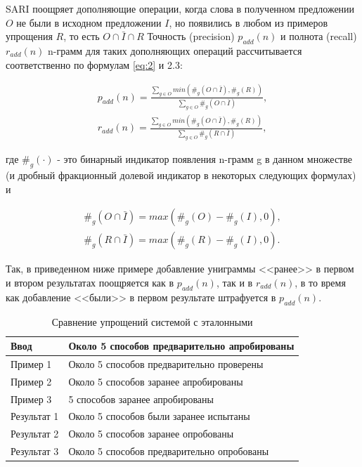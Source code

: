 SARI поощряет дополняющие операции, когда слова в полученном предложении $O$ не были в исходном предложении $I$, но появились в любом из примеров упрощения $R$, то есть $O\cap\bar{I}\cap{R}$
Точность (precision) $p_{add}(n)$ и полнота (recall) $r_{add}(n)$ n-грамм для таких дополняющих операций рассчитывается соответственно по формулам \ref{eq:2} и 2.3: 


\begin{eqnarray} 
	\label{eq:2}
	p_{add}(n) = \frac{\sum\limits_{g\in{O}}^{} min\left( \#_{g}\left(O\cap{\bar{I}}\right), \#_{g}\left(R\right)\right)}{\sum\limits_{g\in{O}}^{} \#_{g}\left(O\cap{\bar{I}}\right)} ,\\
	r_{add}(n) = \frac{\sum\limits_{g\in{O}}^{} min\left( \#_{g}\left(O\cap{\bar{I}}\right), \#_{g}\left(R\right)\right)}{\sum\limits_{g\in{O}}^{} \#_{g}\left(R\cap{\bar{I}}\right)} ,
\end{eqnarray}

где $\#_{g}\left(\cdot\right)$ - это бинарный индикатор появления n-грамм g в данном множестве (и дробный фракционный долевой индикатор в некоторых следующих формулах) и 

\begin{eqnarray} 
	\label{eq:4}
	\#_{g}\left(O\cap{\bar{I}}\right) = max\left(\#_{g}\left(O\right) - \#_{g}\left(I\right), 0\right) ,\\
	\#_{g}\left(R\cap{\bar{I}}\right) = max\left(\#_{g}\left(R\right) - \#_{g}\left(I\right), 0\right) .
\end{eqnarray}

Так, в приведенном ниже примере добавление униграммы <<ранее>> в первом и втором результатах поощряется как в $p_{add}(n)$, так и в $r_{add}(n)$, в то время как добавление <<были>> в первом результате штрафуется в $p_{add}(n)$.

\begin{table}[h]
	\caption{Сравнение упрощений системой с эталонными}
	\label{tabular:example}
	\begin{tabular}{|l|l|}
		\hline
		Ввод        & Около 5 способов предварительно  апробированы \\ \hline
		Пример 1    & Около 5 способов предварительно проверены     \\ \hline
		Пример 2    & Около 5 способов заранее апробированы         \\ \hline
		Пример 3    & 5 способов заранее апробированы               \\ \hline
		Результат 1 & Около 5 способов были заранее испытаны        \\ \hline
		Результат 2 & Около 5 способов заранее опробованы           \\ \hline
		Результат 3 & Около 5 способов предварительно опробованы    \\ \hline
	\end{tabular}
\end{table}

